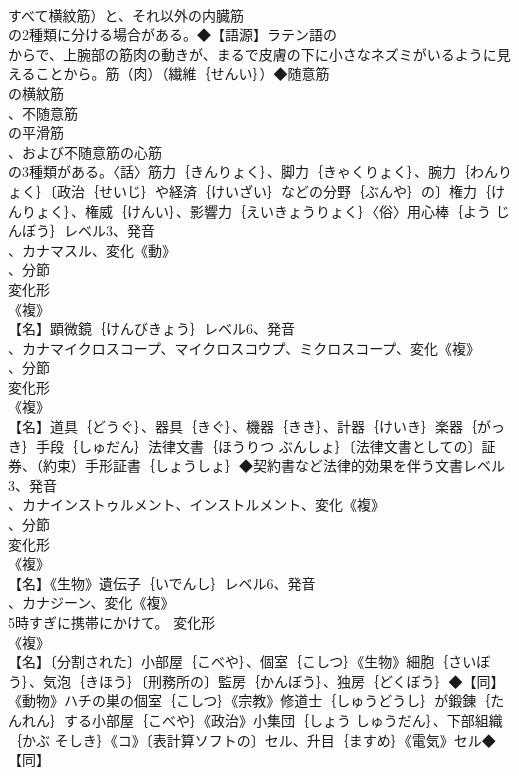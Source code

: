 \documentclass[8pt]{extreport}
\begin{document}
\begin{CJK}{UTF8}{min}
\\	すべて横紋筋）と、それ以外の内臓筋
\\	の2種類に分ける場合がある。◆【語源】ラテン語の
\\	からで、上腕部の筋肉の動きが、まるで皮膚の下に小さなネズミがいるように見えることから。筋（肉）（繊維｛せんい｝）◆随意筋
\\	の横紋筋
\\	、不随意筋
\\	の平滑筋
\\	、および不随意筋の心筋
\\	の3種類がある。〈話〉筋力｛きんりょく｝、脚力｛きゃくりょく｝、腕力｛わんりょく｝〔政治｛せいじ｝や経済｛けいざい｝などの分野｛ぶんや｝の〕権力｛けんりょく｝、権威｛けんい｝、影響力｛えいきょうりょく｝〈俗〉用心棒｛よう じんぼう｝レベル3、発音
\\	、カナマスル、変化《動》
\\	、分節
\\	変化形 
\\	《複》
\\	【名】顕微鏡｛けんびきょう｝レベル6、発音
\\	、カナマイクロスコープ、マイクロスコウプ、ミクロスコープ、変化《複》
\\	、分節
\\	変化形 
\\	《複》
\\	【名】道具｛どうぐ｝、器具｛きぐ｝、機器｛きき｝、計器｛けいき｝楽器｛がっき｝手段｛しゅだん｝法律文書｛ほうりつ ぶんしょ｝〔法律文書としての〕証券、（約束）手形証書｛しょうしょ｝◆契約書など法律的効果を伴う文書レベル3、発音
\\	、カナインストゥルメント、インストルメント、変化《複》
\\	、分節
\\	変化形 
\\	《複》
\\	【名】《生物》遺伝子｛いでんし｝レベル6、発音
\\	、カナジーン、変化《複》
\\	5時すぎに携帯にかけて。	変化形 
\\	《複》
\\	【名】〔分割された〕小部屋｛こべや｝、個室｛こしつ｝《生物》細胞｛さいぼう｝、気泡｛きほう｝〔刑務所の〕監房｛かんぼう｝、独房｛どくぼう｝◆【同】
\\	《動物》ハチの巣の個室｛こしつ｝《宗教》修道士｛しゅうどうし｝が鍛錬｛たんれん｝する小部屋｛こべや｝《政治》小集団｛しょう しゅうだん｝、下部組織｛かぶ そしき｝《コ》〔表計算ソフトの〕セル、升目｛ますめ｝《電気》セル◆【同】

\end{CJK}
\end{document}
